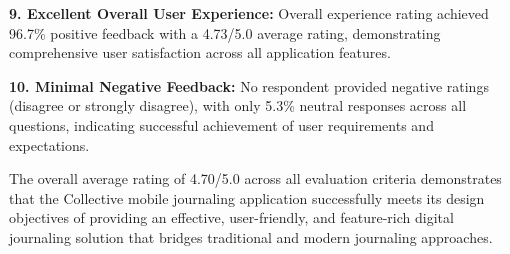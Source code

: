 \textbf{9. Excellent Overall User Experience:} Overall experience rating achieved 96.7\% positive feedback with a 4.73/5.0 average rating, demonstrating comprehensive user satisfaction across all application features.

\textbf{10. Minimal Negative Feedback:} No respondent provided negative ratings (disagree or strongly disagree), with only 5.3\% neutral responses across all questions, indicating successful achievement of user requirements and expectations.

The overall average rating of 4.70/5.0 across all evaluation criteria demonstrates that the Collective mobile journaling application successfully meets its design objectives of providing an effective, user-friendly, and feature-rich digital journaling solution that bridges traditional and modern journaling approaches.
